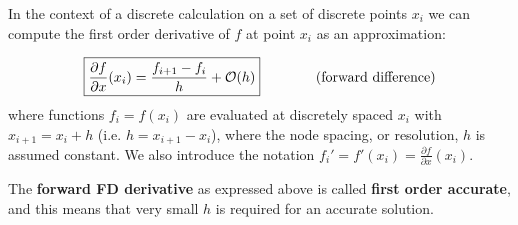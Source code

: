\noindent In the context of a discrete calculation on a set of discrete points $x_i$
we can compute the first order derivative of $f$ at point $x_i$ as an approximation:

\begin{equation}
\boxed{
\frac{\partial f}{\partial x}(x_i) = \frac{f_{i+1}-f_i}{h} + {\cal O}(h) 
}
\qquad
\qquad
\text{(forward difference)} 
\end{equation}
where functions $f_i = f (x_i)$ are evaluated at discretely spaced $x_i$ with $x_{i+1} = x_i + h$ 
(i.e. $h=x_{i+1}-x_i$), where the node spacing, or resolution, $h$ is assumed constant.
We also introduce the notation $f_i'=f'(x_i)=\frac{\partial f}{\partial x} (x_i)$. 


The {\bf forward FD derivative} as expressed above is called {\bf first order accurate},
and this means that very small $h$ is required for an accurate solution.

